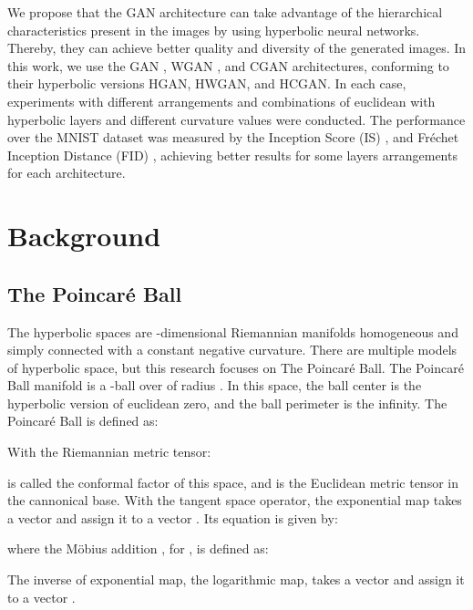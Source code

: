 \documentclass[journal]{IEEEtran}
\begin{document}
We propose that the GAN architecture can take advantage of the hierarchical characteristics present in the images by using hyperbolic neural networks. Thereby, they can achieve better quality and diversity of the generated images. In this work, we use the GAN \cite{gan}, WGAN \cite{wgan}, and CGAN \cite{cgan} architectures, conforming to their hyperbolic versions HGAN, HWGAN, and HCGAN. In each case, experiments with different arrangements and combinations of euclidean with hyperbolic layers and different curvature values were conducted. The performance over the MNIST dataset was measured by the Inception Score (IS) \cite{inception_score}, and Fréchet Inception Distance (FID) \cite{fid}, achieving better results for some layers arrangements for each architecture.













 

\section{Background}
\subsection{The Poincaré Ball}


The hyperbolic spaces  are -dimensional Riemannian manifolds homogeneous and simply connected with a constant negative curvature. There are multiple models of hyperbolic space, but this research focuses on The Poincaré Ball. The Poincaré Ball manifold   is a -ball over  of radius . In this space, the ball center is the hyperbolic version of euclidean zero, and the ball perimeter is the infinity.\newline\newline
The Poincaré Ball   is defined as:

With the Riemannian metric tensor:


 is called the conformal factor of this space, and  is the Euclidean metric tensor in the cannonical base.\newline
With  the tangent space operator, the exponential map takes a vector  and assign it to a vector . Its equation is given by:

where the Möbius addition , for , is defined as:

 The inverse of exponential map, the logarithmic map, takes a vector  and assign it to a vector .
 
\end{document}
